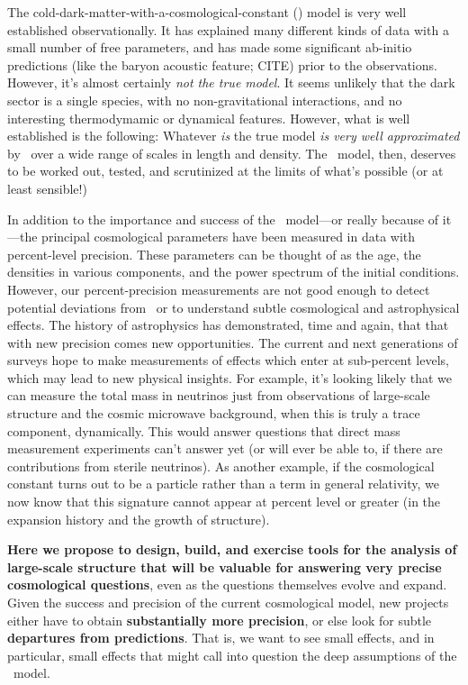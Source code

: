\documentclass[12pt, fullpage, letterpaper]{article}
\begin{document}
The cold-dark-matter-with-a-cosmological-constant (\LCDM) model is
very well established observationally.
It has explained many different
kinds of data with a small number of free parameters, and has made
some significant ab-initio predictions (like the baryon acoustic feature; CITE)
prior to the observations.
However, it's almost certainly \emph{not the true model}.
It seems unlikely that the dark sector is a single species, with no
non-gravitational interactions, and no interesting thermodymamic or
dynamical features.
However, what is well established is the following:
Whatever \emph{is} the true model \emph{is very well approximated} by
\LCDM\ over a wide range of scales in length and density.
The \LCDM\ model, then, deserves to be worked out, tested, and scrutinized at the
limits of what's possible (or at least sensible!)

In addition to the importance and success of the \LCDM\ model---or
really because of it---the principal cosmological parameters have been
measured in data with percent-level precision.
These parameters can be thought of as the age, the densities in
various components, and the power spectrum of the initial conditions.
However, our percent-precision measurements are not good enough to
detect potential deviations from \LCDM\, or to understand subtle
cosmological and astrophysical effects.
The history of astrophysics has demonstrated, time and again, that
that with new precision comes new opportunities.
The current and next generations of surveys hope to
make measurements of effects which enter at sub-percent levels,
which may lead to new physical insights.
For example, it's looking likely that we can measure the total mass in
neutrinos just from observations of large-scale structure and the
cosmic microwave background, when this is truly a trace component,
dynamically.
This would answer questions that direct mass measurement experiments
can't answer yet (or will ever be able to, if there are contributions from sterile neutrinos).
As another example, if the cosmological constant turns out to be a particle rather
than a term in general relativity, we now know that
this signature cannot appear at percent level or greater (in the
expansion history and the growth of structure).

\textbf{Here we propose to design, build, and exercise tools for the
analysis of large-scale structure that will
  be valuable for answering very precise cosmological questions}, even
as the questions themselves evolve and expand.
Given the success and precision of the current
cosmological model, new projects either have to obtain
\textbf{substantially more precision}, or else look for subtle
\textbf{departures from predictions}.
That is, we want to see small effects, and in particular, small
effects that might call into question the deep assumptions of the
\LCDM\ model.
\end{document}
